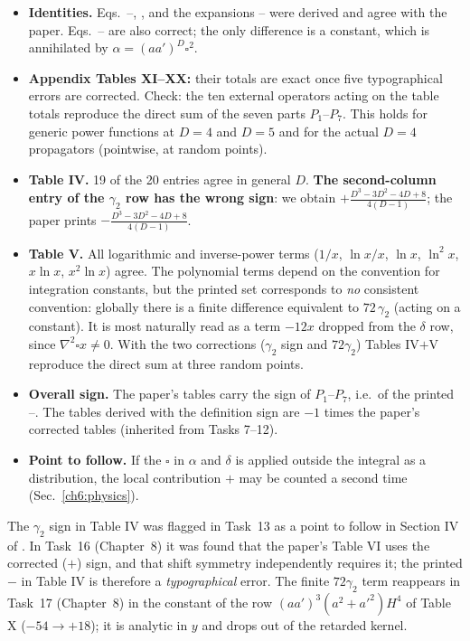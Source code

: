 \begin{resultbox}
\begin{itemize}[leftmargin=12pt,itemsep=2pt]
\item \textbf{Identities.} Eqs.~--, ,  and the expansions --
were derived and agree with the paper. Eqs.~-- are also correct; the only difference is a constant, which is
annihilated by $\alpha=(aa')^D\square^2$.
\item \textbf{Appendix Tables XI--XX:} their totals are exact once five typographical errors are corrected. Check: the ten external operators acting on
the table totals reproduce the direct sum of the seven parts $P_1$--$P_7$. This holds for generic power functions at $D=4$ and $D=5$ and for the
actual $D=4$ propagators (pointwise, at random points).
\item \textbf{Table IV.} 19 of the 20 entries agree in general $D$. \textbf{The second-column entry of the $\gamma_2$ row has the wrong sign}:
we obtain $+\frac{D^3-3D^2-4D+8}{4(D-1)}$; the paper prints $-\frac{D^3-3D^2-4D+8}{4(D-1)}$.
\item \textbf{Table V.} All logarithmic and inverse-power terms ($1/x$, $\ln x/x$, $\ln x$, $\ln^2x$, $x\ln x$, $x^2\ln x$) agree. The polynomial terms
depend on the convention for integration constants, but the printed set corresponds to \emph{no} consistent convention: globally there is a finite
difference equivalent to $72\,\gamma_2$ (acting on a constant). It is most naturally read as a term $-12x$ dropped from the $\delta$ row, since
$\nabla^2\square x\neq0$. With the two corrections ($\gamma_2$ sign and $72\gamma_2$) Tables IV$+$V reproduce the direct sum at three random points.
\item \textbf{Overall sign.} The paper's tables carry the sign of $P_1$--$P_7$, i.e.\ of the printed --. The tables derived with
the definition sign are $-1$ times the paper's corrected tables (inherited from Tasks 7--12).
\item \textbf{Point to follow.} If the $\square$ in $\alpha$ and $\delta$ is applied outside the integral as a distribution, the local contribution
$+$ may be counted a second time (Sec.~\ref{ch6:physics}).
\end{itemize}
\end{resultbox}

\begin{notebox}
The $\gamma_2$ sign in Table IV was flagged in Task~13 as a point to follow in Section IV of \PI. In Task~16 (Chapter~8) it was found that the paper's
Table VI uses the corrected ($+$) sign, and that shift symmetry independently requires it; the printed $-$ in Table IV is therefore a
\emph{typographical} error. The finite $72\gamma_2$ term reappears in Task~17 (Chapter~8) in the constant of the row
$(aa')^3(a^2+a'^2)H^4$ of Table X ($-54\to+18$); it is analytic in $y$ and drops out of the retarded kernel.
\end{notebox}

